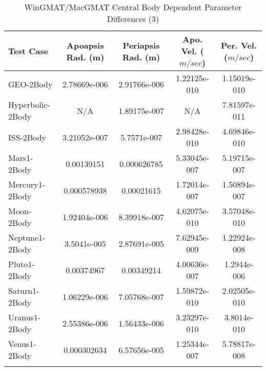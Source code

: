 \begin{table}[htbp!]
\centering
\caption{ WinGMAT/MacGMAT Central Body Dependent Parameter Differences (3)}
      \begin{tabular}{lcccc}
      \hline\hline
          Test Case & Apoapsis Rad. (m) & Periapsis Rad. (m) & Apo. Vel. ($m/sec$) & Per. Vel. ($m/sec$) \\
         \hline
         GEO-2Body & 2.78669e-006 & 2.91766e-006 & 1.22125e-010 & 1.15019e-010 \\
         Hyperbolic-2Body & N/A & 1.89175e-007 & N/A & 7.81597e-011 \\
         ISS-2Body & 3.21052e-007 & 5.7571e-007 & 2.98428e-010 & 4.69846e-010 \\
         Mars1-2Body & 0.00139151 & 0.000626785 & 5.33045e-007 & 5.19715e-007 \\
         Mercury1-2Body & 0.000578938 & 0.00021615 & 1.72014e-007 & 1.50894e-007 \\
         Moon-2Body & 1.92404e-006 & 8.39918e-007 & 4.62075e-010 & 3.57048e-010 \\
         Neptune1-2Body & 3.5041e-005 & 2.87691e-005 & 7.62945e-009 & 1.22924e-008 \\
         Pluto1-2Body & 0.00374967 & 0.00349214 & 4.00636e-007 & 1.2944e-006 \\
         Saturn1-2Body & 1.06229e-006 & 7.05768e-007 & 1.59872e-010 & 2.02505e-010 \\
         Uranus1-2Body & 2.55386e-006 & 1.56433e-006 & 3.23297e-010 & 3.8014e-010 \\
         Venus1-2Body & 0.000302634 & 6.57656e-005 & 1.25344e-007 & 5.78817e-008 \\
      \hline\hline
      \label{Table: WinGMAT-MacGMAT CB Parameters Set 3} 
\end{tabular}
\end{table}
